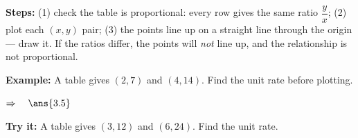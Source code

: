 \documentclass[12pt]{article}
\begin{document}

\begin{formulabox}
\textbf{Steps:} (1) check the table is proportional: every row gives the same
ratio $\dfrac{y}{x}$; (2) plot each $(x, y)$ pair; (3) the points line up on a
straight line through the origin --- draw it. If the ratios differ, the points
will \emph{not} line up, and the relationship is not proportional.
\end{formulabox}

\begin{examplebox}
\textbf{Example:} \quad A table gives $(2, 7)$ and $(4, 14)$. Find the unit
rate before plotting.

$\Rightarrow\quad \ans{3.5}$
\end{examplebox}

\begin{tryitbox}
\textbf{Try it:} \quad A table gives $(3, 12)$ and $(6, 24)$. Find the unit
rate.\\[2pt]
\end{tryitbox}
\end{document}
